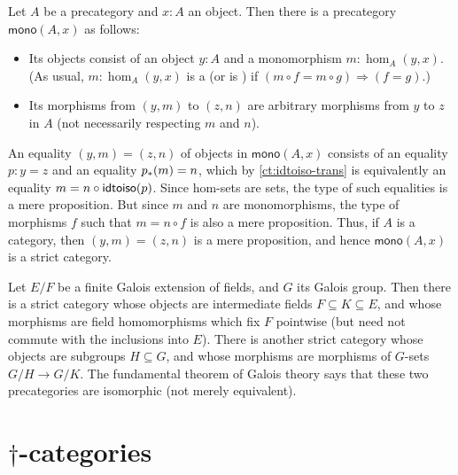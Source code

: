\documentclass[hott-all.tex]{subfiles}
\begin{document}
\begin{eg}
  Let $A$ be a precategory and $x:A$ an object.
  Then there is a precategory $\mathsf{mono}(A,x)$ as follows:
  \begin{itemize}
  \item Its objects consist of an object $y:A$ and a monomorphism $m:\hom_A(y,x)$.
    (As usual, $m:\hom_A(y,x)$ is a  (or is ) if $(m\circ f = m\circ g) \Rightarrow (f=g)$.)
  \item Its morphisms from $(y,m)$ to $(z,n)$ are arbitrary morphisms from $y$ to $z$ in $A$ (not necessarily respecting $m$ and $n$).
  \end{itemize}
  An equality $(y,m)=(z,n)$ of objects in $\mathsf{mono}(A,x)$ consists of an equality $p:y=z$ and an equality ${p}_{*}\mathopen{}\left({m}\right)\mathclose{}=n$, which by \cref{ct:idtoiso-trans} is equivalently an equality $m=n\circ \mathsf{idtoiso}(p)$.
  Since hom-sets are sets, the type of such equalities is a mere proposition.
  But since $m$ and $n$ are monomorphisms, the type of morphisms $f$ such that $m = n\circ f$ is also a mere proposition.
  Thus, if $A$ is a category, then $(y,m)=(z,n)$ is a mere proposition, and hence $\mathsf{mono}(A,x)$ is a strict category.
\end{eg}


\begin{eg}
  Let $E/F$ be a finite Galois extension
  of fields, and $G$ its Galois group.
  Then there is a strict category whose objects are intermediate fields $F\subseteq K\subseteq E$, and whose morphisms are field homomorphisms which fix $F$ pointwise (but need not commute with the inclusions into $E$).
  There is another strict category whose objects are subgroups $H\subseteq G$, and whose morphisms are morphisms of $G$-sets $G/H \to G/K$.
  The fundamental theorem of Galois theory
  says that these two precategories are isomorphic (not merely equivalent).
\end{eg}


\section{\texorpdfstring{$\dagger$}{†}-categories}
\end{document}
